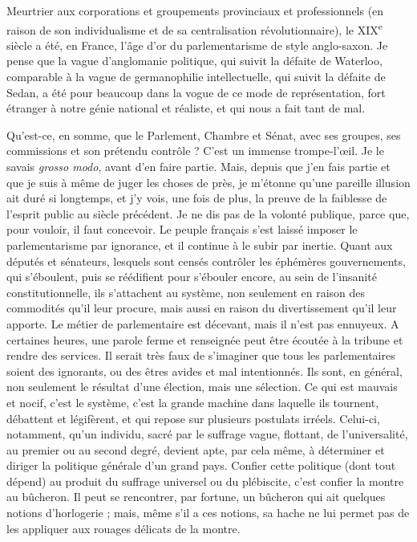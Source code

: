 \documentclass[french,twoside]{book} %
\begin{document}
Meurtrier aux corporations et groupements provinciaux et professionnels (en raison de son individualisme et de sa centralisation révolutionnaire), le XIX\textsuperscript{e} siècle a été, en France, l’âge d’or du parlementarisme de style anglo-saxon. Je pense que la vague d’anglomanie politique, qui suivit la défaite de Waterloo, comparable à la vague de germanophilie intellectuelle, qui suivit la défaite de Sedan, a été pour beaucoup dans la vogue de ce mode de représentation, fort étranger à notre génie national et réaliste, et qui nous a fait tant de mal.\par
Qu’est-ce, en somme, que le Parlement, Chambre et Sénat, avec ses groupes, ses commissions et son prétendu contrôle ? C’est un immense trompe-l’œil. Je le savais {\itshape grosso modo}, avant d’en faire partie. Mais, depuis que j’en fais partie et que je suis à même de juger les choses de près, je m’étonne qu’une pareille illusion ait duré si longtemps, et j’y vois, une fois de plus, la preuve de la faiblesse de l’esprit public au siècle précédent. Je ne dis pas de la volonté publique, parce que, pour vouloir, il faut concevoir. Le peuple français s’est laissé imposer le parlementarisme par ignorance, et il continue à le subir par inertie. Quant aux députés et sénateurs, lesquels sont censés contrôler les éphémères gouvernements, qui s’éboulent, puis se réédifient pour s’ébouler encore, au sein de l’insanité constitutionnelle, ils s’attachent au système, non seulement en raison des commodités qu’il leur procure, mais aussi en raison du divertissement qu’il leur apporte. Le métier de parlementaire est décevant, mais il n’est pas ennuyeux. A certaines heures, une parole ferme et renseignée peut être écoutée à la tribune et rendre des services. Il serait très faux de s’imaginer que tous les parlementaires soient des ignorants, ou des êtres avides et mal intentionnés. Ils sont, en général, non seulement le résultat d’une élection, mais une sélection. Ce qui est mauvais et nocif, c’est le système, c’est la grande machine dans laquelle ils tournent, débattent et légifèrent, et qui repose sur plusieurs postulats irréels. Celui-ci, notamment, qu’un individu, sacré par le suffrage vague, flottant, de l’universalité, au premier ou au second degré, devient apte, par cela même, à déterminer et diriger la politique générale d’un grand pays. Confier cette politique (dont tout dépend) au produit du suffrage universel ou du plébiscite, c’est confier la montre au bûcheron. Il peut se rencontrer, par fortune, un bûcheron qui ait quelques notions d’horlogerie ; mais, même s’il a ces notions, sa hache ne lui permet pas de les appliquer aux rouages délicats de la montre.\par
\end{document}
